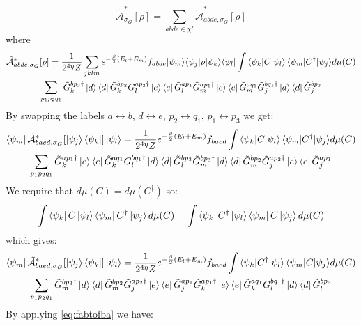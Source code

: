 \documentclass[aps,floatfix,10pt,amssymb,amsfont,amsmath,superscriptaddress,float,nofootinbib,longbibliography,nobalancelastpage,twocolumn]{revtex4-2}
\begin{document}
\begin{widetext}
\begin{equation}
    \tilde{\mathcal{A}}^*_{\sigma_G}[\rho] =  \sum_{abde\in \chi'}\tilde{\mathcal{A}}^*_{abde,\sigma_G}[\rho]
\end{equation}
where 
\begin{multline}
  \tilde{\mathcal{A}}^*_{abde,\sigma_G}[\rho] = \frac{1}{2^{4\eta}Z} \sum_{jklm}  e^{-\frac{\beta}{2}(E_l+E_m)}{f_{abde}} {\ket{\psi_m}}{\bra{\psi_j}}\rho{\ket{\psi_k}}{\bra{\psi_l}} \int {\braket{\psi_k|C|\psi_l}\braket{\psi_m|C^{\dagger}|\psi_j}} d\mu(C)\\\sum_{p_1p_2q_1} {\tilde G^{bp_3\dagger}_k\ket{d}\bra{d}\tilde G^{bp_2}_k} {G_l^{ap_2\dagger}\ket{e}\bra{e}\tilde G_l^{ap_1}\tilde G_m^{ap_1\dagger}\ket{e}\bra{e}\tilde G_m^{aq_1}} {\tilde G^{bq_1\dagger}_j\ket{d}\bra{d}\tilde G^{bp_3}_j } 
\end{multline}
By swapping the labels $a \leftrightarrow b$, $d \leftrightarrow e$, $p_2 \leftrightarrow q_1$, $p_1 \leftrightarrow p_3$ we get:
\begin{multline}
   \bra{\psi_m}\tilde{\mathcal{A}}^*_{baed,\sigma_G}[\ket{\psi_j}\bra{\psi_k}]\ket{\psi_l}  =\frac{1}{2^{4\eta}Z} e^{-\frac{\beta}{2}(E_l+E_m)}{f_{baed}} \int {\braket{\psi_k|C|\psi_l}\braket{\psi_m|C^{\dagger}|\psi_j}} d\mu(C)\\\sum_{p_1p_2q_1} {\tilde G^{ap_1\dagger}_k\ket{e}\bra{e}\tilde G^{aq_1}_k} {G_l^{bq_1\dagger}\ket{d}\bra{d}\tilde G_l^{bp_3}\tilde G_m^{bp_3\dagger}\ket{d}\bra{d}\tilde G_m^{bp_2}} {\tilde G^{ap_2\dagger}_j\ket{e}\bra{e}\tilde G^{ap_1}_j } 
\end{multline}
We require that $d\mu(C) = d\mu(C^{\dagger})$ so:
\begin{equation}
    \int  \bra{\psi_k}C\ket{\psi_{l}}\bra{\psi_m}C^{\dagger} \ket{\psi_j} d\mu(C) = \int  \bra{\psi_k}C^{\dagger}\ket{\psi_{l}}\bra{\psi_m}C \ket{\psi_j} d\mu(C)
\end{equation}
which gives:
\begin{multline}
   \bra{\psi_m}\tilde{\mathcal{A}}^*_{baed,\sigma_G}[\ket{\psi_j}\bra{\psi_k}]\ket{\psi_l}  =\frac{1}{2^{4\eta}Z}  e^{-\frac{\beta}{2}(E_l+E_m)}{f_{baed}}  \int {\braket{\psi_k|C^{\dagger}|\psi_l}\braket{\psi_m|C|\psi_j}} d\mu(C)\\\sum_{p_1p_2q_1} \tilde G_m^{bp_3\dagger} \ket{d}\bra{d}\tilde G_m^{bp_2} {\tilde G^{ap_2\dagger}_j\ket{e}\bra{e}\tilde G^{ap_1}_j } {\tilde G^{ap_1\dagger}_k\ket{e}\bra{e}\tilde G^{aq_1}_k} G_l^{bq_1\dagger}\ket{d}\bra{d}\tilde G_l^{bp_3} 
\end{multline}
By applying \eqref{eq:fabtofba} we have:

\end{widetext}
\end{document}
